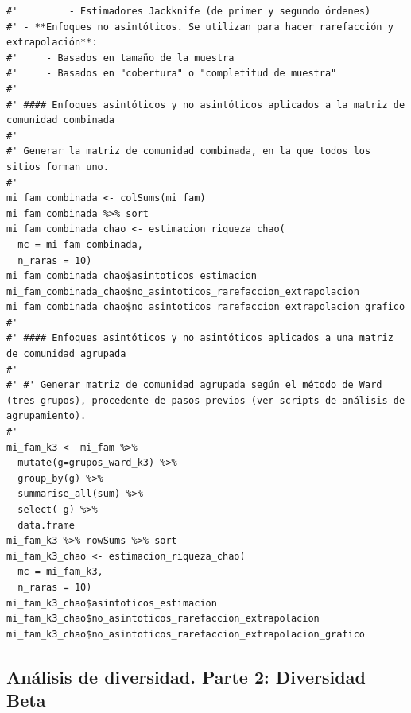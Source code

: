 \documentclass[11pt,]{article}
\begin{document}
\begin{verbatim}
#'         - Estimadores Jackknife (de primer y segundo órdenes)
#' - **Enfoques no asintóticos. Se utilizan para hacer rarefacción y extrapolación**:
#'     - Basados en tamaño de la muestra
#'     - Basados en "cobertura" o "completitud de muestra"
#' 
#' #### Enfoques asintóticos y no asintóticos aplicados a la matriz de comunidad combinada
#' 
#' Generar la matriz de comunidad combinada, en la que todos los sitios forman uno.
#' 
mi_fam_combinada <- colSums(mi_fam)
mi_fam_combinada %>% sort
mi_fam_combinada_chao <- estimacion_riqueza_chao(
  mc = mi_fam_combinada,
  n_raras = 10)
mi_fam_combinada_chao$asintoticos_estimacion
mi_fam_combinada_chao$no_asintoticos_rarefaccion_extrapolacion
mi_fam_combinada_chao$no_asintoticos_rarefaccion_extrapolacion_grafico
#'
#' #### Enfoques asintóticos y no asintóticos aplicados a una matriz de comunidad agrupada
#' 
#' #' Generar matriz de comunidad agrupada según el método de Ward (tres grupos), procedente de pasos previos (ver scripts de análisis de agrupamiento).
#' 
mi_fam_k3 <- mi_fam %>%
  mutate(g=grupos_ward_k3) %>%
  group_by(g) %>%
  summarise_all(sum) %>%
  select(-g) %>% 
  data.frame
mi_fam_k3 %>% rowSums %>% sort
mi_fam_k3_chao <- estimacion_riqueza_chao(
  mc = mi_fam_k3,
  n_raras = 10)
mi_fam_k3_chao$asintoticos_estimacion
mi_fam_k3_chao$no_asintoticos_rarefaccion_extrapolacion
mi_fam_k3_chao$no_asintoticos_rarefaccion_extrapolacion_grafico
\end{verbatim}

\subsection{Análisis de diversidad. Parte 2: Diversidad
Beta}\label{anuxe1lisis-de-diversidad.-parte-2-diversidad-beta}
\end{document}
